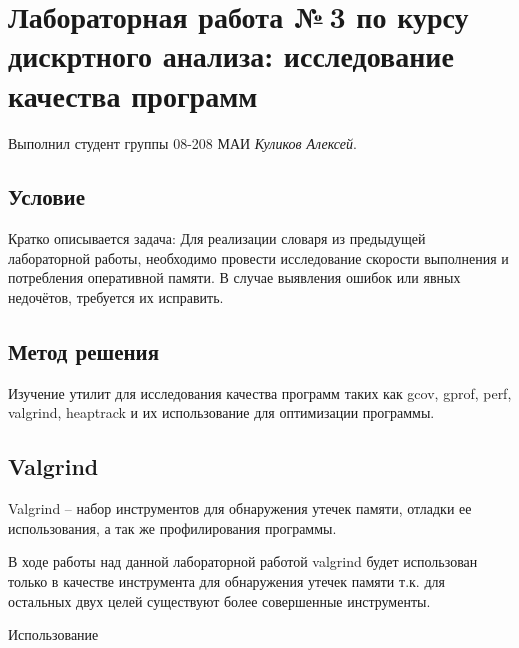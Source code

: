 \documentclass[12pt]{article}
\begin{document}
\section*{Лабораторная работа №\,3 по курсу дискртного анализа: исследование качества программ}

Выполнил студент группы 08-208 МАИ \textit{Куликов Алексей}.

\subsection*{Условие}

Кратко описывается задача:
Для реализации словаря из предыдущей лабораторной работы, необходимо провести исследование скорости выполнения и потребления оперативной памяти. В случае выявления ошибок или явных недочётов, требуется их исправить.

\subsection*{Метод решения}

Изучение утилит для исследования качества программ таких как gcov, gprof, perf, valgrind, heaptrack и их использование для оптимизации программы.

\subsection*{Valgrind}

Valgrind -- набор инструментов для обнаружения утечек памяти, отладки ее использования, а так же профилирования программы.

В ходе работы над данной лабораторной работой valgrind будет использован только в качестве инструмента для обнаружения утечек памяти т.к. для остальных двух целей существуют более совершенные инструменты.

Использование 
\end{document}
